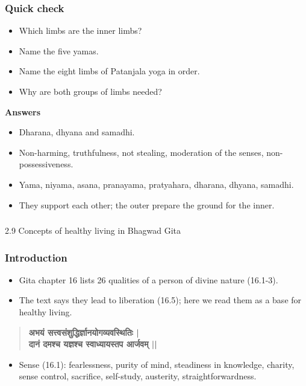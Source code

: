 \begin{frame}[fragile]\frametitle{Quick check}

\begin{itemize}
    \item Which limbs are the inner limbs?
    \item Name the five yamas.
    \item Name the eight limbs of Patanjala yoga in order.
    \item Why are both groups of limbs needed?
\end{itemize}
\vspace{0.5em}
\textbf{Answers}
\begin{itemize}
    \item Dharana, dhyana and samadhi.
    \item Non-harming, truthfulness, not stealing, moderation of the senses, non-possessiveness.
    \item Yama, niyama, asana, pranayama, pratyahara, dharana, dhyana, samadhi.
    \item They support each other; the outer prepare the ground for the inner.
\end{itemize}

\end{frame}

\begin{frame}[fragile]\frametitle{}
\begin{center}
{\Large 2.9 Concepts of healthy living in Bhagwad Gita}
\end{center}
\end{frame}

\begin{frame}[fragile]\frametitle{Introduction}
    \begin{itemize}
        \item Gita chapter 16 lists 26 qualities of a person of divine nature (16.1-3).
        \item The text says they lead to liberation (16.5); here we read them as a base for healthy living.
    \end{itemize}
    \begin{quote}
        \textbf{अभयं सत्त्वसंशुद्धिर्ज्ञानयोगव्यवस्थितिः |}\\
        \textbf{दानं दमश्च यज्ञश्च स्वाध्यायस्तप आर्जवम् ||}
    \end{quote}
    \begin{itemize}
        \item Sense (16.1): fearlessness, purity of mind, steadiness in knowledge, charity, sense control, sacrifice, self-study, austerity, straightforwardness.
    \end{itemize}
\end{frame}

